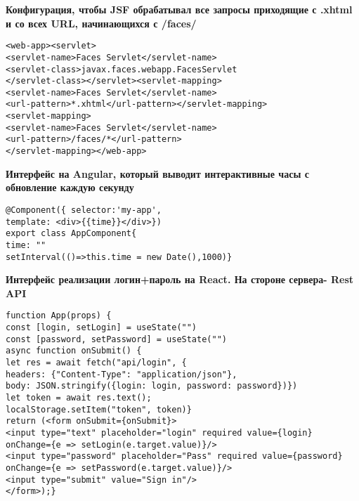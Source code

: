 \documentclass{article}
\begin{document}
\begin{minipage}[t]{0.3\textwidth}
    \textbf{Конфигурация, чтобы JSF обрабатывал все запросы приходящие с .xhtml и со всех URL, начинающихся с /faces/}
    \begin{lstlisting}[frame=single, basicstyle=\tiny\ttfamily, breaklines=true, breakatwhitespace=true, postbreak=\mbox{\textcolor{red}{$\hookrightarrow$}\space}]
<web-app><servlet>
<servlet-name>Faces Servlet</servlet-name>
<servlet-class>javax.faces.webapp.FacesServlet
</servlet-class></servlet><servlet-mapping>
<servlet-name>Faces Servlet</servlet-name>
<url-pattern>*.xhtml</url-pattern></servlet-mapping>
<servlet-mapping>
<servlet-name>Faces Servlet</servlet-name> 
<url-pattern>/faces/*</url-pattern>
</servlet-mapping></web-app>
    \end{lstlisting}
\end{minipage}%
\hfill
\begin{minipage}[t]{0.3\textwidth}
    \textbf{Интерфейс на Angular, который выводит интерактивные часы с обновление каждую секунду}
    \begin{lstlisting}[frame=single, basicstyle=\tiny\ttfamily, breaklines=true, breakatwhitespace=true, postbreak=\mbox{\textcolor{red}{$\hookrightarrow$}\space}]
@Component({ selector:'my-app', 
template: <div>{{time}}</div>})
export class AppComponent{
time: ""
setInterval(()=>this.time = new Date(),1000)}
    \end{lstlisting}
\end{minipage}%
\hfill
\begin{minipage}[t]{0.3\textwidth}
    \textbf{Интерфейс реализации логин+пароль на React. На стороне сервера- Rest API}
    \begin{lstlisting}[frame=single, basicstyle=\tiny\ttfamily, breaklines=true, breakatwhitespace=true, postbreak=\mbox{\textcolor{red}{$\hookrightarrow$}\space}]
function App(props) {
const [login, setLogin] = useState("")
const [password, setPassword] = useState("")
async function onSubmit() {
let res = await fetch("api/login", {
headers: {"Content-Type": "application/json"},
body: JSON.stringify({login: login, password: password})})
let token = await res.text();
localStorage.setItem("token", token)}
return (<form onSubmit={onSubmit}>
<input type="text" placeholder="login" required value={login}
onChange={e => setLogin(e.target.value)}/>
<input type="password" placeholder="Pass" required value={password}
onChange={e => setPassword(e.target.value)}/>
<input type="submit" value="Sign in"/>
</form>);}
    \end{lstlisting}
\end{minipage}%
\\
\end{document}
